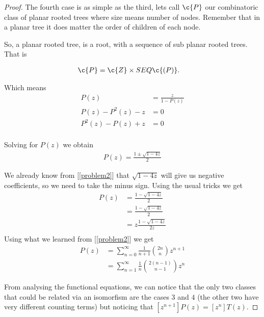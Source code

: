 \begin{proof}
    The fourth case is as simple as the third, lets call $\c{P}$ our combinatoric class of planar rooted trees where size means number
    of nodes. Remember that in a planar tree it does matter the order of children of each node.\pn
    
    So, a planar rooted tree, is a root, with a sequence of sub planar rooted trees. That is
    
    \begin{align}
        \c{P}   &= \c{Z} \times SEQ\c{(P)}. 
    \end{align}\pn
    
    Which means
    \begin{align}
        P(z)               &=  \frac{z}{1 - P(z)}  \\
        P(z) - P^2(z) - z  &=  0                   \\
        P^2(z) - P(z) + z  &=  0                   \\
    \end{align}\pn
    
    Solving for $P(z)$ we obtain
    \begin{align}
        P(z) = \frac{1 \pm \sqrt{ 1 - 4z}}{2}
    \end{align}
    
    We already know from [\ref{problem2}] that $\sqrt{ 1 - 4z}$ will give us negative coefficients, so we need to take the minus sign.
    Using the usual tricks we get
    \begin{align}
       P(z)     &=  \frac{1 - \sqrt{ 1 - 4z}}{2}      \\
                &=  \frac{1 - \sqrt{ 1 - 4z}}{2}      \\
                &=  z \frac{1 - \sqrt{ 1 - 4z}}{2z}   \\
    \end{align}
     Using what we learned from [\ref{problem2}] we get
    \begin{align}
       P(z)     &= \sum_{n = 0}^{\infty} \frac{1}{n+1} \binom{2n}{n} z^{n + 1}    \\
                &= \sum_{n = 1}^{\infty} \frac{1}{n} \binom{2(n-1)}{n-1} z^{n}
    \end{align}
    
    From analysing the functional equations, we can notice that the only two classes that could be related via an isomorfism
    are the cases $3$ and $4$ (the other two have very different counting terms) but noticing that $[z^{n + 1}] P(z) = [z^n] T(z)$.\pn
    

\end{proof}

